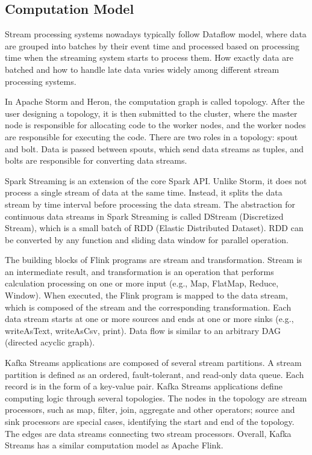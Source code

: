\documentclass[pdftex,twocolumn,10pt,letterpaper]{article}
\begin{document}
\subsection{Computation Model}
Stream processing systems nowadays typically follow Dataflow model\cite{Dataflow}, where data are grouped into batches by their event time and processed based on processing time when the streaming system starts to process them. How exactly data are batched and how to handle late data varies widely among different stream processing systems. 

In Apache Storm and Heron, the computation graph is called topology. After the user designing a topology, it is then submitted to the cluster, where the master node is responsible for allocating code to the worker nodes, and the worker nodes are responsible for executing the code. There are two roles in a topology: spout and bolt. Data is passed between spouts, which send data streams as tuples, and bolts are responsible for converting data streams.

Spark Streaming is an extension of the core Spark API. Unlike Storm, it does not process a single stream of data at the same time. Instead, it splits the data stream by time interval before processing the data stream. The abstraction for continuous data streams in Spark Streaming is called DStream (Discretized Stream), which is a small batch of RDD (Elastic Distributed Dataset). RDD can be converted by any function and sliding data window for parallel operation.

The building blocks of Flink programs are stream and transformation. Stream is an intermediate result, and transformation is an operation that performs calculation processing on one or more input (e.g., Map, FlatMap, Reduce, Window). When executed, the Flink program is mapped to the data stream, which is composed of the stream and the corresponding transformation. Each data stream starts at one or more sources and ends at one or more sinks (e.g., writeAsText, writeAsCsv, print). Data flow is similar to an arbitrary DAG (directed acyclic graph). 

Kafka Streams applications are composed of several stream partitions. A stream partition is defined as an ordered, fault-tolerant, and read-only data queue. Each record is in the form of a key-value pair. Kafka Streams applications define computing logic through several topologies. The nodes in the topology are stream processors, such as map, filter, join, aggregate and other operators; source and sink processors are special cases, identifying the start and end of the topology. The edges are data streams connecting two stream processors. Overall, Kafka Streams has a similar computation model as Apache Flink. 
\end{document}
